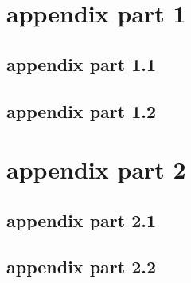 \documentclass[a4paper,11pt]{article}
\begin{document}
\appendix
\section{appendix part 1}
\subsection{appendix part 1.1}
\subsection{appendix part 1.2}
\section{appendix part 2}
\subsection{appendix part 2.1}
\subsection{appendix part 2.2}
\end{document}
